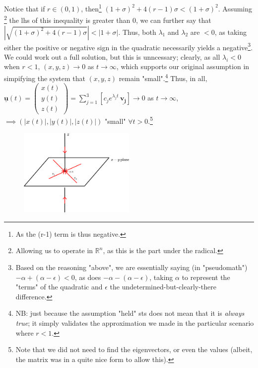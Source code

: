 \documentclass[12pt, oneside]{article}
\begin{document}
Notice that if $r \in (0,1)$, then\footnote{As the (r-1) term is thus negative.} $(1+\sigma)^2 + 4(r-1)\sigma < (1+\sigma)^2$. Assuming \footnote{Allowing us to operate in $\mathbb{R}^n$, as this is the part under the radical.} the lhs of this inequality is greater than $0$, we can further say that $\left|\sqrt{(1+\sigma)^2 + 4(r-1)\sigma }\right|< \left|1+ \sigma\right|$. Thus, both $\lambda_1$ and $\lambda_2$ are $<0$, as taking either the positive or negative sign in the quadratic necessarily yields a negative\footnote{Based on the reasoning "above", we are essentially saying (in "pseudomath") $-\alpha + (\alpha - \epsilon) < 0$, as does $-
\alpha - (\alpha - \epsilon)$, taking $\alpha$ to represent the "terms" of the quadratic and $\epsilon$ the undetermined-but-clearly-there difference.}. We could work out a full solution, but this is unncessary; clearly, as all $\lambda_i < 0$ when $r < 1$, $(x,y,z) \to 0$ as $t \to \infty$, which supports our original assumption in simpifying the system that $(x,y,z)$ remain "small".\footnote{NB: just because the assumption "held" sts does not mean that it is \textit{always true}; it simply validates the approximation we made in the particular scenario where $r < 1$.} Thus, in all, $\underline{\mathbf{u}}(t) = \begin{pmatrix}
  x(t)\\
  y(t)\\
  z(t)
\end{pmatrix} = \sum_{j=1}^{3}\left[c_j e^{\lambda_j t}\,\underline{\mathbf{v_j}}\right] \to 0$ as $t \to \infty$, $\implies \left(\left|x(t)\right|,\left|y(t)\right|,\left|z(t)\right|\right)$ "small" $\forall t > 0$.\footnote{Note that we did not need to find the eigenvectors, or even the values (albeit, the matrix was in a quite nice form to allow this).}

\begin{figure}[!h]
  \centering
  \includegraphics*[width=0.5\textwidth]{figures/rlessthan1.png}
\end{figure}
\end{document}
